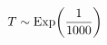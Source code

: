 \documentclass[preview]{standalone}
\begin{document}
\begin{align*}
\special{dvisvgm:raw <g id='unique000'>}T\sim\operatorname{Exp}\!\left(\dfrac{1}{1000}\right)\special{dvisvgm:raw </g>}
\end{align*}
\end{document}
